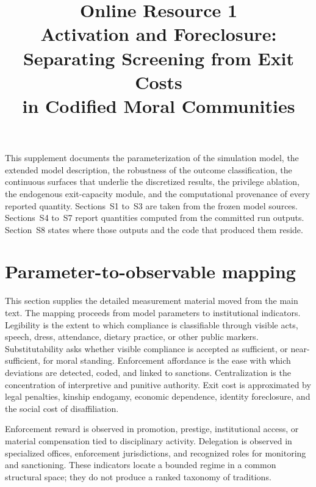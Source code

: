 \documentclass[12pt]{article}
\title{Online Resource 1\\[0.5em]
\large Activation and Foreclosure: Separating Screening from Exit Costs\\in Codified Moral Communities}
\author{}
\date{}
\begin{document}
\maketitle

\noindent This supplement documents the parameterization of the simulation model,
the extended model description, the robustness of the outcome classification,
the continuous surfaces that underlie the discretized results, the privilege
ablation, the endogenous exit-capacity module, and the computational provenance
of every reported quantity. Sections~S1 to~S3 are taken from the frozen model
sources. Sections~S4 to~S7 report quantities computed from the committed run
outputs. Section~S8 states where those outputs and the code that produced them
reside.

\section{Parameter-to-observable mapping}
\label{sec:observable-mapping}

This section supplies the detailed measurement material moved from the main
text. The mapping proceeds from model parameters to institutional indicators.
Legibility is the extent to which compliance is classifiable through visible
acts, speech, dress, attendance, dietary practice, or other public markers.
Substitutability asks whether visible compliance is accepted as sufficient, or
near-sufficient, for moral standing. Enforcement affordance is the ease with
which deviations are detected, coded, and linked to sanctions. Centralization
is the concentration of interpretive and punitive authority. Exit cost is
approximated by legal penalties, kinship endogamy, economic dependence,
identity foreclosure, and the social cost of disaffiliation.

Enforcement reward is observed in promotion, prestige, institutional access,
or material compensation tied to disciplinary activity. Delegation is observed
in specialized offices, enforcement jurisdictions, and recognized roles for
monitoring and sanctioning. These indicators locate a bounded regime in a
common structural space; they do not produce a ranked taxonomy of traditions.
\end{document}
